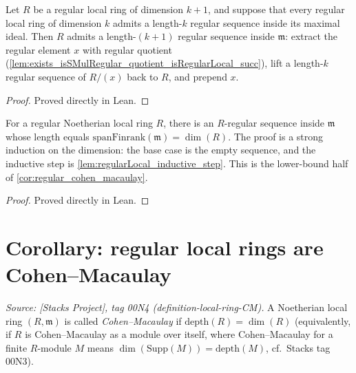 \begin{lemma}
  \label{lem:regularLocal_inductive_step}
  Let \(R\) be a regular local ring of dimension \(k + 1\), and suppose that every regular
  local ring of dimension \(k\) admits a length-\(k\) regular sequence inside its maximal
  ideal. Then \(R\) admits a length-\((k+1)\) regular sequence inside \(\mathfrak m\): extract
  the regular element \(x\) with regular quotient
  (\cref{lem:exists_isSMulRegular_quotient_isRegularLocal_succ}), lift a length-\(k\)
  regular sequence of \(R/(x)\) back to \(R\), and prepend \(x\).
\end{lemma}
\begin{proof}

\leanok
  Proved directly in Lean.
\end{proof}

\begin{lemma}
  \label{lem:exists_isRegular_of_regularLocal}
  For a regular Noetherian local ring \(R\), there is an \(R\)-regular sequence inside
  \(\mathfrak m\) whose length equals \(\text{spanFinrank}(\mathfrak m) = \dim(R)\). The proof is a
  strong induction on the dimension: the base case is the empty sequence, and the
  inductive step is \cref{lem:regularLocal_inductive_step}. This is the lower-bound half
  of \cref{cor:regular_cohen_macaulay}.
\end{lemma}
\begin{proof}

\leanok
  Proved directly in Lean.
\end{proof}

\section{Corollary: regular local rings are Cohen--Macaulay}
\label{sec:ab_regular_cm}

\begin{definition}

  \label{def:cohen_macaulay_local}
  \textit{Source: [Stacks Project], tag 00N4 (definition-local-ring-CM).}
  A Noetherian local ring \((R, \mathfrak{m})\) is called \emph{Cohen--Macaulay} if
  \(\text{depth}(R) = \dim(R)\) (equivalently, if \(R\) is Cohen--Macaulay as a module
  over itself, where Cohen--Macaulay for a finite \(R\)-module \(M\) means
  \(\dim(\text{Supp}(M)) = \text{depth}(M)\), cf.\ Stacks tag 00N3).
\end{definition}

